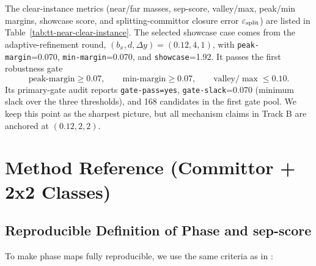 \documentclass[11pt]{article}
\begin{document}
The clear-instance metrics (near/far masses, sep-score, valley/max, peak/min margins, showcase score, and splitting-committor closure error $\varepsilon_{\rm split}$) are listed in Table~\ref{tab:tt-near-clear-instance}. The selected showcase case comes from the adaptive-refinement round, $(b_x,d,\Delta y)=(0.12,4,1)$, with \texttt{peak-margin}=0.070, \texttt{min-margin}=0.070, and \texttt{showcase}=1.92. It passes the first robustness gate
\[
\mathrm{peak\mbox{-}margin}\ge 0.07,\qquad \mathrm{min\mbox{-}margin}\ge 0.07,\qquad \mathrm{valley}/\max\le 0.10.
\]
Its primary-gate audit reports \texttt{gate-pass=yes}, \texttt{gate-slack}=0.070 (minimum slack over the three thresholds), and 168 candidates in the first gate pool. We keep this point as the sharpest picture, but all mechanism claims in Track B are anchored at $(0.12,2,2)$.

\section{Method Reference (Committor + 2x2 Classes)}
\subsection*{Reproducible Definition of Phase and sep-score}
To make phase maps fully reproducible, we use the same criteria as in :
\end{document}
